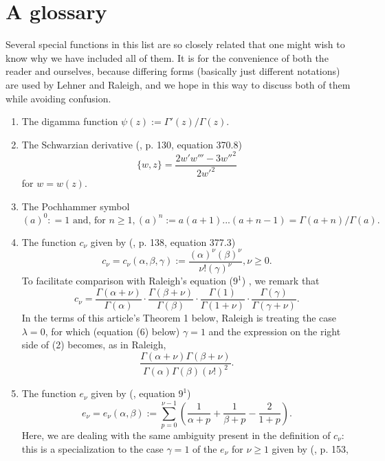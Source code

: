 \documentclass{article}
\begin{document}
\section{A glossary}
Several special functions in this list 
are so closely related that one might
wish to know why we have included all of them.
It is for the convenience of both
the reader and ourselves, because
differing forms (basically
just different notations)
are used by Lehner and Raleigh, 
and we hope in this way to discuss
both of them while avoiding confusion.
\begin{enumerate}
\item The digamma function
$\psi(z):=\Gamma'(z)/\Gamma(z)$.
\item The Schwarzian derivative
(\cite{caratheodory2}, p. 130, 
equation 370.8)
\begin{equation}
\{w,z\} = 
\frac{2 w' w''' - 3w''^2}{2w'^2}
\end{equation}
for $w = w(z)$.
\item The Pochhammer  symbol
$$
(a)^0: = 1 \text{ and, for }
n \geq 1,
(a)^n:=a(a+1)...(a+n-1) = \Gamma(a+n)/\Gamma(a).
$$
\item The function $c_{\nu}$ given by (\cite{caratheodory2}, 
p. 138, equation 377.3)
$$
c_{\nu} = c_{\nu}(\alpha, \beta, \gamma) :=  
\frac{(\alpha)^{\nu} (\beta)^{\nu}}
{{\nu}!(\gamma)^{\nu}}, {\nu} \geq 0.
$$
To facilitate comparison with
Raleigh's  
equation ($9^1$) 
\cite{raleigh1962fourier}, we remark that 
\begin{equation}
c_{\nu} = 
\frac{\Gamma(\alpha + {\nu})}{\Gamma(\alpha)}
\cdot \frac{\Gamma(\beta + {\nu})}{\Gamma(\beta)}
\cdot \frac{\Gamma(1)}{\Gamma(1 + {\nu})}
\cdot \frac{\Gamma(\gamma)}{\Gamma(\gamma + {\nu})}.
\end{equation}
In the terms of this article's Theorem 1 
below, Raleigh is treating the
case $\lambda = 0$, for which 
(equation (6) below) $\gamma = 1$
and the expression on the right side of (2)
becomes, as in Raleigh,
$$\frac{\Gamma(\alpha + {\nu})\Gamma(\beta + {\nu})}
{\Gamma(\alpha)\Gamma(\beta)({\nu}!)^2}.$$
\item The function $e_{\nu}$ given by
(\cite{raleigh1962fourier}, equation $9^1$)
$$
e_{\nu} = e_{\nu}(\alpha, \beta) :=  
\sum_{p = 0}^{{\nu} - 1}
\left ( \frac 1{\alpha + p} + 
\frac 1{\beta + p} 
- \frac 2{1 + p} \right ).
$$
Here, we are dealing with the 
same ambiguity present in the
definition of $c_{\nu}$:
this is a specialization to the
case $\gamma = 1$ of the
$e_{\nu}$ 
for ${\nu} \geq 1$
given by (\cite{caratheodory2}, p. 153,

\end{enumerate}
\end{document}

